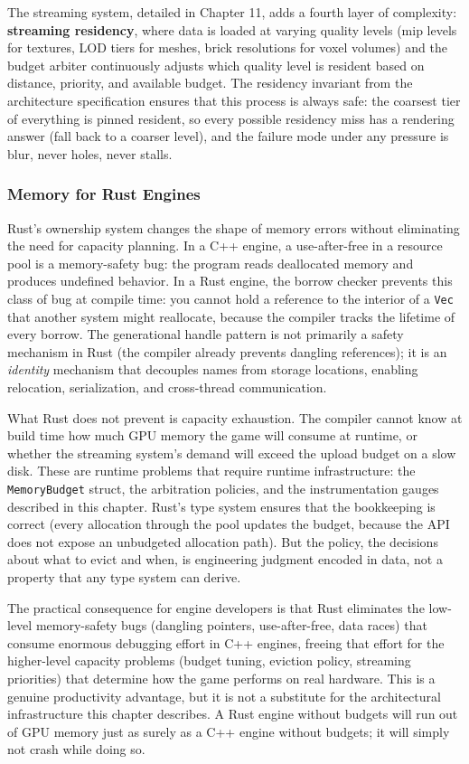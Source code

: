 \documentclass[
  11pt,
  letterpaper,
  DIV=11,
  numbers=noendperiod,
  twoside,
  open=right]{scrreprt}
\begin{document}
The streaming system, detailed in Chapter 11, adds a fourth layer of
complexity: \textbf{streaming residency}, where data is loaded at
varying quality levels (mip levels for textures, LOD tiers for meshes,
brick resolutions for voxel volumes) and the budget arbiter continuously
adjusts which quality level is resident based on distance, priority, and
available budget. The residency invariant from the architecture
specification ensures that this process is always safe: the coarsest
tier of everything is pinned resident, so every possible residency miss
has a rendering answer (fall back to a coarser level), and the failure
mode under any pressure is blur, never holes, never stalls.

\subsubsection{Memory for Rust Engines}\label{memory-for-rust-engines}

Rust's ownership system changes the shape of memory errors without
eliminating the need for capacity planning. In a C++ engine, a
use-after-free in a resource pool is a memory-safety bug: the program
reads deallocated memory and produces undefined behavior. In a Rust
engine, the borrow checker prevents this class of bug at compile time:
you cannot hold a reference to the interior of a \texttt{Vec} that
another system might reallocate, because the compiler tracks the
lifetime of every borrow. The generational handle pattern is not
primarily a safety mechanism in Rust (the compiler already prevents
dangling references); it is an \emph{identity} mechanism that decouples
names from storage locations, enabling relocation, serialization, and
cross-thread communication.

What Rust does not prevent is capacity exhaustion. The compiler cannot
know at build time how much GPU memory the game will consume at runtime,
or whether the streaming system's demand will exceed the upload budget
on a slow disk. These are runtime problems that require runtime
infrastructure: the \texttt{MemoryBudget} struct, the arbitration
policies, and the instrumentation gauges described in this chapter.
Rust's type system ensures that the bookkeeping is correct (every
allocation through the pool updates the budget, because the API does not
expose an unbudgeted allocation path). But the policy, the decisions
about what to evict and when, is engineering judgment encoded in data,
not a property that any type system can derive.

The practical consequence for engine developers is that Rust eliminates
the low-level memory-safety bugs (dangling pointers, use-after-free,
data races) that consume enormous debugging effort in C++ engines,
freeing that effort for the higher-level capacity problems (budget
tuning, eviction policy, streaming priorities) that determine how the
game performs on real hardware. This is a genuine productivity
advantage, but it is not a substitute for the architectural
infrastructure this chapter describes. A Rust engine without budgets
will run out of GPU memory just as surely as a C++ engine without
budgets; it will simply not crash while doing so.
\end{document}
